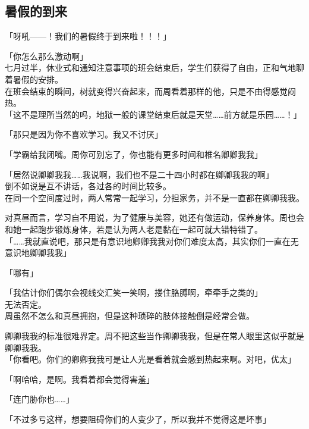 \subsection{暑假的到来}

「呀吼——！我们的暑假终于到来啦！！！」

「你怎么那么激动啊」\\

七月过半，休业式和通知注意事项的班会结束后，学生们获得了自由，正和气地聊着暑假的安排。\\

在班会结束的瞬间，树就变得兴奋起来，而周看着那样的他，只是不由得感觉闷热。\\

「这不是理所当然的吗，地狱一般的课堂结束后就是天堂……前方就是乐园……！」

「那只是因为你不喜欢学习。我又不讨厌」

「学霸给我闭嘴。周你可别忘了，你也能有更多时间和椎名卿卿我我」

「居然说卿卿我我……我说啊，我们也不是二十四小时都在卿卿我我的啊」\\

倒不如说是互不讲话，各过各的时间比较多。\\

在同一个空间度过时，两人常常一起学习，分担家务，并不是一直都在卿卿我我。

对真昼而言，学习自不用说，为了健康与美容，她还有做运动，保养身体。周也会和她一起跑步锻炼身体，若是认为两人老是黏在一起可就大错特错了。\\

「……我就直说吧，那只是有意识地卿卿我我对你们难度太高，其实你们一直在无意识地卿卿我我」

「哪有」

「我估计你们偶尔会视线交汇笑一笑啊，搂住胳膊啊，牵牵手之类的」\\

无法否定。\\

周虽然不怎么和真昼拥抱，但是这种琐碎的肢体接触倒是经常会做。

卿卿我我的标准很难界定。周不把这些当作卿卿我我，但是在常人眼里这似乎就是卿卿我我。\\

「你看吧。你们的卿卿我我可是让人光是看着就会感到热起来啊。对吧，优太」

「啊哈哈，是啊。我看着都会觉得害羞」

「连门胁你也……」

「不过多亏这样，想要阻碍你们的人变少了，所以我并不觉得这是坏事」\\

